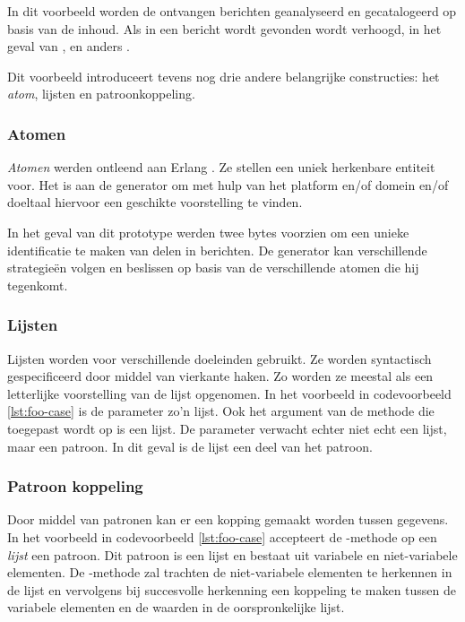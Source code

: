 In dit voorbeeld worden de ontvangen berichten geanalyseerd en gecatalogeerd op
basis van de inhoud. Als in een bericht  wordt gevonden wordt
 verhoogd, in het geval van , 
en anders .

Dit voorbeeld introduceert tevens nog drie andere belangrijke constructies: het
\emph{atom}, lijsten en patroonkoppeling.

\vspace{-3mm}

\subsubsection{Atomen}

\emph{Atomen} werden ontleend aan Erlang \citep{armstrong1993concurrent}. Ze
stellen een uniek herkenbare entiteit voor. Het is aan de generator om met hulp
van het platform en/of domein en/of doeltaal hiervoor een geschikte
voorstelling te vinden.

In het geval van dit prototype werden twee bytes voorzien om een unieke
identificatie te maken van delen in berichten. De generator kan verschillende
strategie\"en volgen en beslissen op basis van de verschillende atomen die hij
tegenkomt.

\vspace{-3mm}

\subsubsection{Lijsten}

Lijsten worden voor verschillende doeleinden gebruikt. Ze worden syntactisch
gespecificeerd door middel van vierkante haken. Zo worden ze meestal als een
letterlijke voorstelling van de lijst opgenomen. In het voorbeeld in
codevoorbeeld \ref{lst:foo-case} is de  parameter zo'n lijst. Ook
het argument van de  methode die toegepast wordt op 
is een lijst. De parameter verwacht echter niet echt een lijst, maar een
patroon. In dit geval is de lijst een deel van het patroon.

\vspace{-3mm}

\subsubsection{Patroon koppeling}

Door middel van patronen kan er een kopping gemaakt worden tussen gegevens. In
het voorbeeld in codevoorbeeld \ref{lst:foo-case} accepteert de
-methode op een \emph{lijst} een patroon. Dit patroon is een
lijst en bestaat uit variabele en niet-variabele elementen. De
-methode zal trachten de niet-variabele elementen te herkennen in
de lijst en vervolgens bij succesvolle herkenning een koppeling te maken tussen
de variabele elementen en de waarden in de oorspronkelijke lijst.

